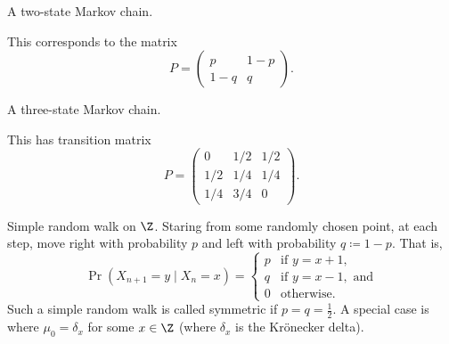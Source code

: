 \begin{examples}
    \item A two-state Markov chain.
    \begin{center}
    \end{center}
    This corresponds to the matrix \[
        P = \begin{pmatrix}
            p & 1-p \\
            1-q & q
        \end{pmatrix}.
    \]
    \item A three-state Markov chain.
    \begin{center}
    \end{center}
    This has transition matrix \[
        P = \begin{pmatrix}
            0 & 1/2 & 1/2 \\
            1/2 & 1/4 & 1/4 \\
            1/4 & 3/4 & 0
        \end{pmatrix}.
    \]
    \item Simple random walk on $\Z$.
    Staring from some randomly chosen point, at each step, move right with
    probability $p$ and left with probability $q \coloneq 1-p$.
    That is, \[
        \Pr(X_{n+1} = y \mid X_n = x) = \begin{cases}
            p & \text{if } y = x + 1, \\
            q & \text{if } y = x - 1, \text{ and} \\
            0 & \text{otherwise}.
        \end{cases}
    \]
    Such a simple random walk is called symmetric if $p = q = \frac12$.
    A special case is where $\mu_0 = \delta_x$ for some $x \in \Z$ (where
    $\delta_x$ is the Kr\"onecker delta).


\end{examples}
